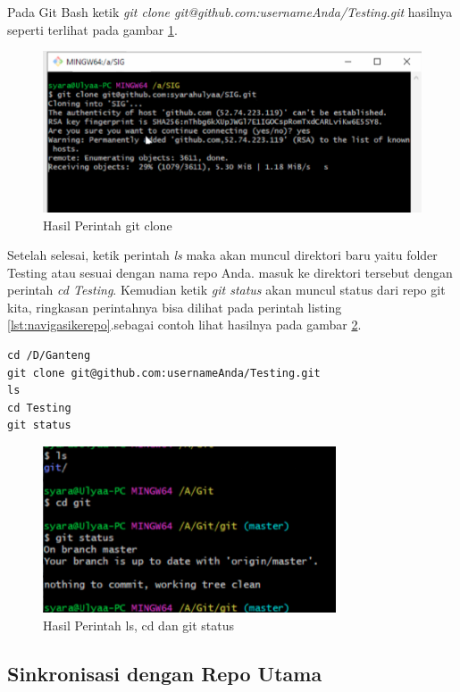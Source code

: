 Pada Git Bash ketik \textit{git clone git@github.com:usernameAnda/Testing.git} hasilnya seperti terlihat pada gambar \ref{gitclone}. 

\begin{figure}[!htbp]
\centerline{\includegraphics[width=.75\textwidth]{Figures/gitclone}}
\caption{Hasil Perintah git clone}
\label{gitclone}
\end{figure}

Setelah selesai, ketik perintah \textit{ls} maka akan muncul direktori baru yaitu folder Testing atau sesuai dengan nama repo Anda. masuk ke direktori tersebut dengan perintah \textit{cd Testing}. Kemudian ketik \textit{git status} akan muncul status dari repo git kita, ringkasan perintahnya bisa dilihat pada perintah listing \ref{lst:navigasikerepo}.sebagai contoh lihat hasilnya pada gambar \ref{lscdstatus}.

\begin{lstlisting}[caption=Navigasi direktori menuju repositori,label={lst:navigasikerepo}]
cd /D/Ganteng
git clone git@github.com:usernameAnda/Testing.git
ls 
cd Testing
git status
\end{lstlisting}

\begin{figure}[!htbp]
\centerline{\includegraphics[width=.75\textwidth]{Figures/lscdstatus}}
\caption{Hasil Perintah ls, cd dan git status}
\label{lscdstatus}
\end{figure}

\subsection{Sinkronisasi dengan Repo Utama}

